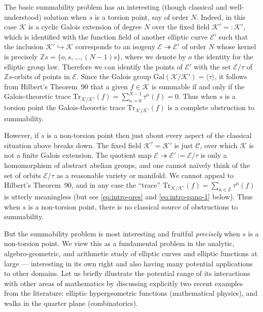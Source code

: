 \documentclass[preprint,12pt]{elsarticle}
\numberwithin{equation}{section} %
\theoremstyle{theorem}
\theoremstyle{definition}
\newcommand{\Ca}{\mathcal{C}} %
\newcommand{\bk}{\mathcal{K}} %
\newcommand{\ec}{\mathcal{E}} %
\newcommand{\idec}{{o}} %
\newcommand{\orbita}{{\ec/\tau}} %
\newcommand{\Z}{\mathbb{Z}} %
\begin{document}
The basic summability problem has an interesting (though classical and well-understood) solution when $s$ is a torsion point, say of order $N$. Indeed, in this case $\bk$ is a cyclic Galois extension of degree $N$ over the fixed field $\bk^\tau=:\bk'$, which is identified with the function field of another elliptic curve $\ec'$ such that the inclusion $\bk'\hookrightarrow \bk$ corresponds to an isogeny $\ec\twoheadrightarrow\ec'$ of order $N$ whose kernel is precisely $\Z s=\{\idec,s,\dots,(N-1)s\}$, where we denote by $\idec$ the identity for the elliptic group law. Therefore we can identify the points of $\ec'$ with the set $\orbita$ of $\Z s$-orbits of points in $\ec$. Since the Galois group $\mathrm{Gal}(\bk/\bk')=\langle \tau\rangle$, it follows from Hilbert's Theorem~90 that a given $f\in\bk$ is summable if and only if the Galois-theoretic trace $\mathrm{Tr}_{\bk/\bk'}(f)=\sum_{n=0}^{N-1}\tau^n(f)=0$. Thus when $s$ is a torsion point the Galois-theoretic trace $\mathrm{Tr}_{\bk/\bk'}(f)$ is a complete obstruction to summability.

However, if $s$ is a non-torsion point then just about every aspect of the classical situation above breaks down. The fixed field $\bk^\tau=\bk'$ is just $\Ca$, over which $\bk$ is not a finite Galois extension. The quotient map $\ec\twoheadrightarrow \ec':=\orbita$ is only a homomorphism of abstract abelian groups, and one cannot na\"ively think of the set of orbits $\orbita$ as a reasonable variety or manifold. We cannot appeal to Hilbert's Theorem~90, and in any case the ``trace'' $\mathrm{Tr}_{\bk/\bk'}(f)=\sum_{n\in\Z}\tau^n(f)$ is utterly meaningless (but see \eqref{eq:intro-ores} and \eqref{eq:intro-pano-1} below). Thus when $s$ is a non-torsion point, there is no classical source of obstructions to summability.

But the summability problem is most interesting and fruitful \emph{precisely} when $s$ is a non-torsion point. %
We view this as a fundamental problem in the analytic, algebro-geometric, and arithmetic study of elliptic curves and elliptic functions at large --- interesting in its own right and also having many potential applications to other domains. Let us briefly illustrate the potential range of its interactions with other areas of mathematics by discussing explicitly two recent examples from the literature: elliptic hypergeometric functions (mathematical physics), and walks in the quarter plane (combinatorics).
\end{document}
